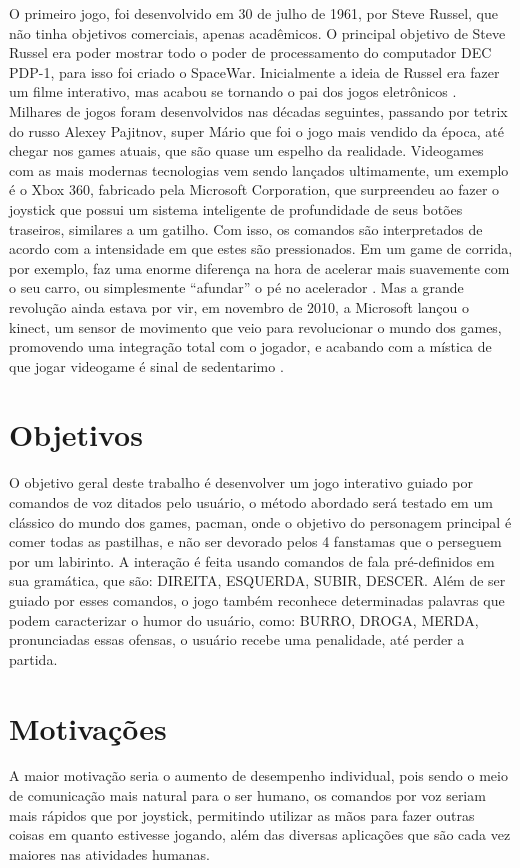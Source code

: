     O primeiro jogo, foi desenvolvido em 30 de julho de 1961, por Steve Russel, que não tinha objetivos comerciais, apenas acadêmicos. O principal objetivo de Steve Russel era poder mostrar todo o poder de processamento do computador DEC PDP-1, para isso foi criado o SpaceWar. Inicialmente a ideia de Russel era fazer um filme interativo, mas acabou se tornando o pai dos jogos eletrônicos \cite{HistJogosHenrique}. Milhares de jogos foram desenvolvidos nas décadas seguintes, passando por tetrix do russo Alexey Pajitnov, super Mário que foi o jogo mais vendido da época, até chegar nos games atuais, que são quase um espelho da realidade. Videogames com as mais modernas tecnologias vem sendo lançados ultimamente, um exemplo é o Xbox 360, fabricado pela Microsoft Corporation, que surpreendeu ao fazer o joystick que possui um sistema inteligente de profundidade de seus botões traseiros, similares a um gatilho. Com isso, os comandos são interpretados de acordo com a intensidade em que estes são pressionados. Em um game de corrida, por exemplo, faz uma enorme diferença na hora de acelerar mais suavemente com o seu carro, ou simplesmente “afundar” o pé no acelerador \cite{XBoxTechT}. Mas a grande revolução ainda estava por vir, em novembro de 2010, a Microsoft lançou o kinect, um sensor de movimento que veio para revolucionar o mundo dos games, promovendo uma integração total com o jogador, e acabando com a mística de que jogar videogame é sinal de sedentarimo \cite{KinectTechT}.

\section{Objetivos}
O objetivo geral deste trabalho é desenvolver um jogo interativo guiado por comandos de voz ditados pelo usuário, o método abordado será testado em um clássico do mundo dos games, pacman, onde o objetivo do personagem principal é comer todas as pastilhas, e não ser devorado pelos 4 fanstamas que o perseguem por um labirinto. A interação é feita usando comandos de fala pré-definidos em sua gramática, que são: DIREITA, ESQUERDA, SUBIR, DESCER. Além de ser guiado por esses comandos, o jogo também reconhece determinadas palavras que podem caracterizar o humor do usuário, como: BURRO, DROGA, MERDA, pronunciadas essas ofensas, o usuário recebe uma penalidade, até perder a partida. 

\section{Motivações}
A maior motivação seria o aumento de desempenho individual, pois sendo o meio de comunicação mais natural para o ser humano, os comandos por voz seriam mais rápidos que por joystick, permitindo utilizar as mãos para fazer outras coisas em quanto estivesse jogando, além das diversas aplicações que são cada vez maiores nas atividades humanas.

